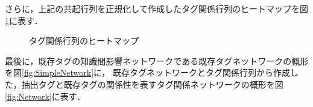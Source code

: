 \newpage
さらに，上記の共起行列を正規化して作成したタグ関係行列のヒートマップを図\ref{fig:Normalized}に表す．

\begin{figure}[H]
\begin{center}
\hspace*{-20pt}
\end{center}
\caption{タグ関係行列のヒートマップ}
\label{fig:Normalized}
\end{figure}

最後に，既存タグの知識間影響ネットワークである既存タグネットワークの概形を図\ref{fig:SimpleNetwork}に，
既存タグネットワークとタグ関係行列から作成した，抽出タグと既存タグの関係性を表すタグ関係ネットワークの概形を図\ref{fig:Network}に表す．

